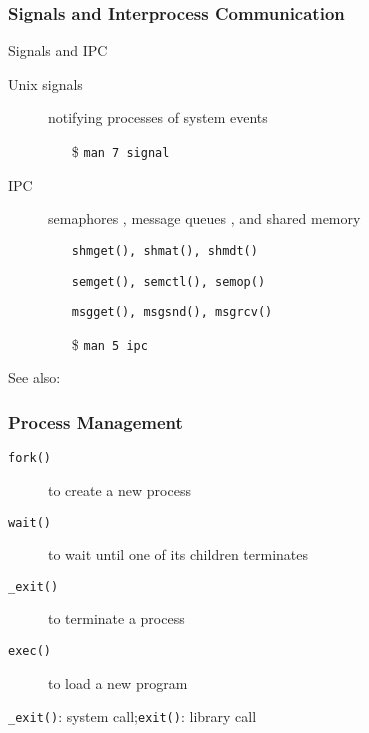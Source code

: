 \subsubsection{Signals and Interprocess Communication}

\begin{frame}
  \begin{block}{Signals and IPC}
    \begin{description}
    \item[Unix signals] notifying processes of system events
      \begin{itemize}
      \item[\$] \texttt{man 7 signal}
      \end{itemize}
    \item[IPC] semaphores , message queues , and shared memory
      \begin{itemize}
      \item[] \texttt{shmget(), shmat(), shmdt()}
      \item[] \texttt{semget(), semctl(), semop()}
      \item[] \texttt{msgget(), msgsnd(), msgrcv()}
      \item[\$] \texttt{man 5 ipc}
      \end{itemize}
    \end{description}
  \end{block}
\end{frame}

See also: 

\subsubsection{Process Management}

\begin{frame}
  \begin{description}
  \item[\texttt{fork()}] to create a new process
  \item[\texttt{wait()}] to wait until one of its children terminates
  \item[\texttt{\_exit()}] to terminate a process
  \item[\texttt{exec()}] to load a new program
  \end{description}
\end{frame}

\texttt{\_exit()}: system call;\qquad \texttt{exit()}: library call

